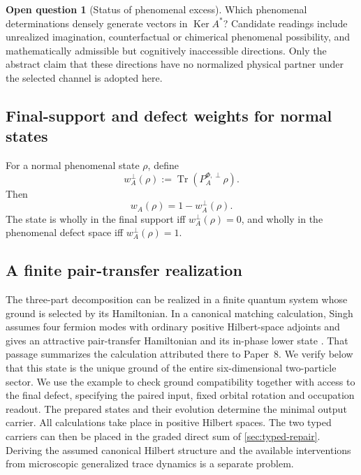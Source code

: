 \documentclass[11pt,reqno]{scrartcl}
\DeclareMathOperator{\Ker}{Ker}
\newcommand{\defectProjF}{P_{A}^{\Phi,\perp}}
\DeclareMathOperator{\Tr}{Tr}
\newcommand{\presentWeight}{w_{A}}
\newcommand{\defectWeight}{w_{A}^{\perp}}
\theoremstyle{plain}
\theoremstyle{definition}
\newtheorem{openquestion}[openquestion]{Open question}
\theoremstyle{remark}
\begin{document}
\begin{openquestion}[Status of phenomenal excess]
\label{oq:status-phenomenal-excess}
Which phenomenal determinations densely generate vectors in $\Ker A^*$?
Candidate readings include unrealized imagination, counterfactual or
chimerical phenomenal possibility, and mathematically admissible but
cognitively inaccessible directions.  Only the abstract claim that these
directions have no normalized physical partner under the selected channel is
adopted here.
\end{openquestion}

\subsection{Final-support and defect weights for normal states}

For a normal phenomenal state $\rho$, define
\begin{equation}
  \boxed{
  \defectWeight(\rho)
  :=\Tr(\defectProjF\rho).}
  \label{eq:excess-weight-density}
\end{equation}
Then
\begin{equation}
  \boxed{
  \presentWeight(\rho)
  =1-\defectWeight(\rho).}
  \label{eq:actualization-excess-complement}
\end{equation}
The state is wholly in the final support iff $\defectWeight(\rho)=0$, and
wholly in the phenomenal defect space iff $\defectWeight(\rho)=1$.

\subsection{A finite pair-transfer realization}
\label{sec:finite-pair-realization}

The three-part decomposition can be realized in a finite quantum system
whose ground is selected by its Hamiltonian.  In a canonical matching
calculation, Singh assumes four fermion modes with ordinary positive
Hilbert-space adjoints and gives an attractive pair-transfer Hamiltonian
and its in-phase lower state
\cite[p.~13, \S3.4, Eq.~(3.11)]{Singh2026PairTransfer}.
That passage summarizes the calculation attributed there to Paper~8.
We verify below that this state is the unique ground of the entire
six-dimensional two-particle sector.  We use the example to check ground
compatibility together with access to the final defect, specifying the
paired input, fixed orbital rotation and occupation readout.  The prepared
states and their evolution determine the minimal output carrier.
All calculations take place in positive Hilbert spaces.  The two typed
carriers can then be placed in the graded direct sum of
\cref{sec:typed-repair}.  Deriving the assumed canonical Hilbert structure
and the available interventions from microscopic generalized trace
dynamics is a separate problem.
\end{document}
